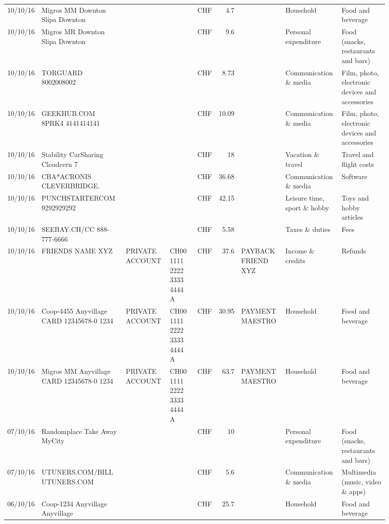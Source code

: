 \begin{landscape}
\begin{sidewaysfigure}
\begin{table}[h]
\begin{center}
\begin{tabular}{rllllrlll}
		10/10/16 & Migros MM Downton Slipa   Downton &       &       & CHF   & 4.7   &       & Household & Food and beverage \\
		10/10/16 & Migros MR Downton Slipa   Downton &       &       & CHF   & 9.6   &       & Personal expenditure & Food (snacks, restaurants and bars) \\
		10/10/16 & TORGUARD                 8002008002 &       &       & CHF   & 8.73  &       & Communication \& media & Film, photo, electronic devices and accessories \\
		10/10/16 & GEEKHUB.COM  8PRK4        4141414141 &       &       & CHF   & 10.09 &       & Communication \& media & Film, photo, electronic devices and accessories \\
		10/10/16 & Stability CarSharing      Cloudcern 7 &       &       & CHF   & 18    &       & Vacation \& travel & Travel and flight costs \\
		10/10/16 & CBA*ACRONIS              CLEVERBRIDGE. &       &       & CHF   & 36.68 &       & Communication \& media & Software \\
		10/10/16 & PUNCHSTARTERCOM           9292929292 &       &       & CHF   & 42.15 &       & Leisure time, sport \& hobby & Toys and hobby articles \\
		10/10/16 & SEEBAY.CH/CC               888-777-6666 &       &       & CHF   & 5.58  &       & Taxes \& duties & Fees \\
		10/10/16 & FRIENDS NAME XYZ & PRIVATE ACCOUNT & CH00 1111 2222 3333 4444 A & CHF   & 37.6  & PAYBACK FRIEND XYZ & Income \& credits & Refunds \\
		10/10/16 & Coop-4455 Anyvillage CARD 12345678-0 1234 & PRIVATE ACCOUNT & CH00 1111 2222 3333 4444 A & CHF   & 30.95 & PAYMENT MAESTRO & Household & Food and beverage \\
		10/10/16 & Migros MM Anyvillage CARD 12345678-0 1234 & PRIVATE ACCOUNT & CH00 1111 2222 3333 4444 A & CHF   & 63.7  & PAYMENT MAESTRO & Household & Food and beverage \\
		07/10/16 & Randomplace Take Away     MyCity &       &       & CHF   & 10    &       & Personal expenditure & Food (snacks, restaurants and bars) \\
		07/10/16 & UTUNERS.COM/BILL          UTUNERS.COM &       &       & CHF   & 5.6   &       & Communication \& media & Multimedia (music, video \& apps) \\
		06/10/16 & Coop-1234 Anyvillage    Anyvillage &       &       & CHF   & 25.7  &       & Household & Food and beverage \\

\end{tabular}
\end{center}
\end{table}
\end{sidewaysfigure}
\end{landscape}
